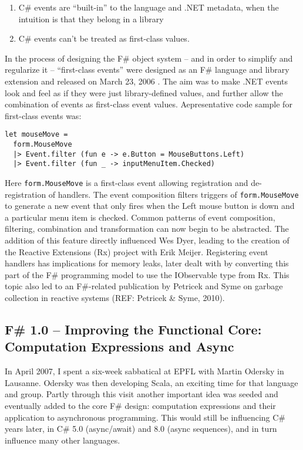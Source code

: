 \documentclass[acmsmall,review]{acmart}\settopmatter{printfolios=true,printccs=false,printacmref=false}
\begin{document}
\begin{enumerate}
\item C\# events are “built-in” to the language and .NET metadata, when the intuition is that they belong in a library
\item C\# events can’t be treated as first-class values.  
\end{enumerate}

In the process of designing the F\# object system – and in order to simplify and regularize it – “first-class events” were designed as an F\# language and library extension and released on March 23, 2006 .  The aim was to make .NET events look and feel as if they were just library-defined values, and further allow the combination of events as first-class event values. Aepresentative code sample for first-class events was:

\begin{verbatim}
let mouseMove = 
  form.MouseMove 
  |> Event.filter (fun e -> e.Button = MouseButtons.Left)
  |> Event.filter (fun _ -> inputMenuItem.Checked)
\end{verbatim}

Here \texttt{form.MouseMove} is a first-class event allowing registration and de-registration of handlers.  The event composition filters triggers of \texttt{form.MouseMove} to generate a new event that only fires when the Left mouse button is down and a particular menu item is checked.  Common patterns of event composition, filtering, combination and transformation can now begin to be abstracted.  The addition of this feature directly influenced Wes Dyer, leading to the creation of the Reactive Extensions (Rx) project with Erik Meijer.  Registering event handlers has implications for memory leaks, later dealt with by converting this part of the F\# programming model to use the IObservable type from Rx.  This topic also led to an F\#-related publication by Petricek and Syme on garbage collection in reactive systems (REF: Petricek \& Syme, 2010).



\subsection*{F\# 1.0 – Improving the Functional Core: Computation Expressions and Async}

In April 2007, I spent a six-week sabbatical at EPFL with Martin Odersky in Lausanne.  Odersky was then developing Scala, an exciting time for that language and group. Partly through this visit another important idea was seeded and eventually added to the core F\# design: computation expressions and their application to asynchronous programming.  This would still be influencing C\# years later, in C\# 5.0 (async/await) and 8.0 (async sequences), and in turn influence many other languages. 
\end{document}
